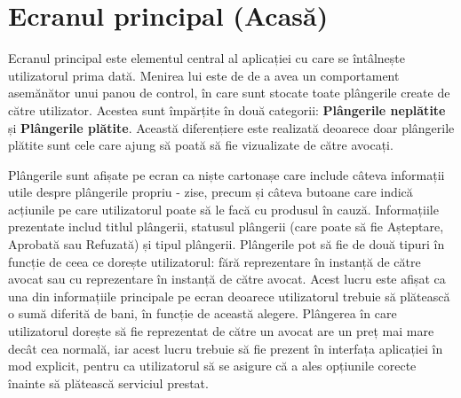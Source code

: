 \documentclass[12pt,a4paper]{report}
\theoremstyle{definition}
\theoremstyle{remark}
\begin{document}
\section*{Ecranul principal (Acasă)}
Ecranul principal este elementul central al aplicației cu care se întâlnește utilizatorul prima dată. Menirea lui este de de a avea un comportament asemănător unui panou de control, în care sunt stocate toate plângerile create de către utilizator. Acestea sunt împărțite în două categorii: \textbf{Plângerile neplătite} și \textbf{Plângerile plătite}. Această diferențiere este realizată deoarece doar plângerile plătite sunt cele care ajung să poată să fie vizualizate de către avocați. 

Plângerile sunt afișate pe ecran ca niște cartonașe care include câteva informații utile despre plângerile propriu - zise, precum și câteva butoane care indică acțiunile pe care utilizatorul poate să le facă cu produsul în cauză. Informațiile prezentate includ titlul plângerii, statusul plângerii (care poate să fie Așteptare, Aprobată sau Refuzată) și tipul plângerii. Plângerile pot să fie de două tipuri în funcție de ceea ce dorește utilizatorul: fără reprezentare în instanță de către avocat sau cu reprezentare în instanță de către avocat. Acest lucru este afișat ca una din informațiile principale pe ecran deoarece utilizatorul trebuie să plătească o sumă diferită de bani, în funcție de această alegere. Plângerea în care utilizatorul dorește să fie reprezentat de către un avocat are un preț mai mare decât cea normală, iar acest lucru trebuie să fie prezent în interfața aplicației în mod explicit, pentru ca utilizatorul să se asigure că a ales opțiunile corecte înainte să plătească serviciul prestat. 
\end{document}
